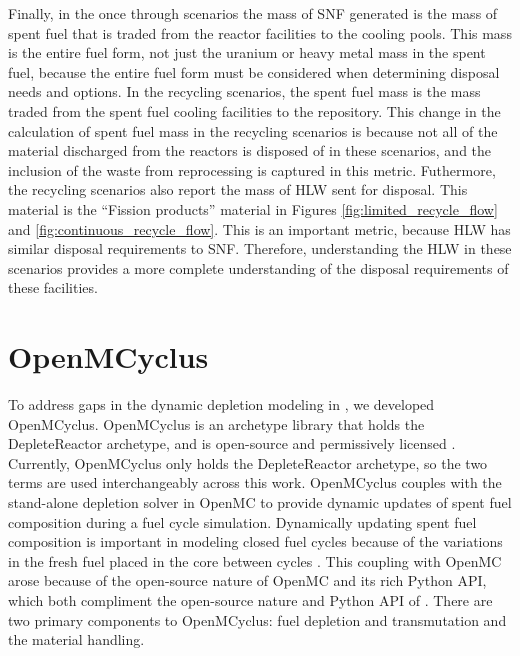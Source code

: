 Finally, in the once through scenarios the mass of \gls{SNF} generated is 
the mass of spent fuel that is 
traded from the reactor facilities to the cooling pools. This mass is the 
entire fuel form, not just the uranium or heavy metal mass in the spent 
fuel, because the entire fuel form must be considered when determining 
disposal needs and options. In the recycling scenarios, the spent fuel 
mass is the mass traded from the spent fuel cooling facilities 
to the repository. This change in the calculation of spent fuel mass 
in the recycling scenarios is because not all of the material discharged 
from the reactors is disposed of in these scenarios, and the inclusion of 
the waste from reprocessing is captured in this metric. Futhermore, 
the recycling scenarios also report the mass of \gls{HLW} sent 
for disposal. This material is the ``Fission products'' material 
in Figures \ref{fig:limited_recycle_flow} and \ref{fig:continuous_recycle_flow}.
This is an important metric, because \gls{HLW} has similar 
disposal requirements to \gls{SNF}. Therefore, understanding the 
\gls{HLW} in these scenarios provides a more complete understanding 
of the disposal requirements of these facilities. 

\section{OpenMCyclus}\label{sec:openmcyclus}
To address gaps in the dynamic depletion modeling in \Cyclus, we 
developed OpenMCyclus. 
OpenMCyclus is an archetype library that holds the DepleteReactor 
archetype, and is open-source and permissively licensed 
\cite{bachmann_openmcyclus_2023}. 
Currently, OpenMCyclus only holds the DepleteReactor archetype, so 
the two terms are used interchangeably across this work. OpenMCyclus couples 
\Cyclus with the stand-alone depletion solver in OpenMC 
\cite{romano_depletion_2021} to provide 
dynamic updates of spent fuel composition during a fuel cycle simulation.
Dynamically updating spent fuel composition is important in 
modeling closed fuel cycles because of the variations in the 
fresh fuel placed in the core between cycles \cite{sunny_transition_2015}.
This coupling with OpenMC arose because 
of the open-source nature of OpenMC and its rich Python \gls{API}, 
which both compliment the open-source nature and Python \gls{API} 
of \Cyclus. 
There are two primary components to OpenMCyclus: fuel depletion and 
transmutation and the material handling. 

